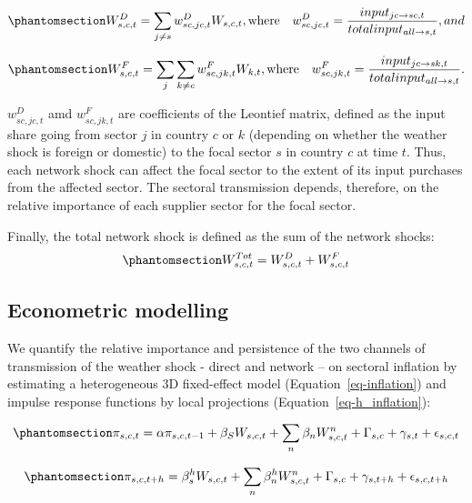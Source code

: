 \documentclass[
  letterpaper,
  DIV=11,
  numbers=noendperiod]{scrartcl}
\begin{document}
\begin{equation}\phantomsection\label{eq-dom_net_shock}{
W_{s,c,t}^D = \sum_{j \neq s} w_{sc,jc,t}^D W_{s,c,t} , \text{where} \quad w_{sc,jc,t}^D = \frac{input_{jc \rightarrow sc,t}}{total input_{all \rightarrow s,t}}, and
}\end{equation}

\begin{equation}\phantomsection\label{eq-foreign_net_shock}{
W_{s,c,t}^F = \sum_j \sum_{k \neq c} w_{sc,jk,t}^F W_{k,t} , \text{where} \quad w_{sc,jk,t}^F = \frac{input_{jc \rightarrow sk,t}}{total input_{all \rightarrow s,t}}.
}\end{equation}

\(w_{sc, jc, t}^D\) amd \(w_{sc, jk, t}^F\) are coefficients of the
Leontief matrix, defined as the input share going from sector \(j\) in
country \(c\) or \(k\) (depending on whether the weather shock is
foreign or domestic) to the focal sector \(s\) in country \(c\) at time
\(t\). Thus, each network shock can affect the focal sector to the
extent of its input purchases from the affected sector. The sectoral
transmission depends, therefore, on the relative importance of each
supplier sector for the focal sector.

Finally, the total network shock is defined as the sum of the network
shocks: \begin{equation}\phantomsection\label{eq-total_net_shock}{
W_{s,c,t}^{Tot} = W_{s,c,t}^D+ W_{s,c,t}^F
}\end{equation}

\subsection{Econometric modelling}\label{econometric-modelling}

We quantify the relative importance and persistence of the two channels
of transmission of the weather shock - direct and network -- on sectoral
inflation by estimating a heterogeneous 3D fixed-effect model
(Equation~\ref{eq-inflation}) and impulse response functions by local
projections (Equation~\ref{eq-h_inflation}):

\begin{equation}\phantomsection\label{eq-inflation}{
\pi_{s,c,t} = \alpha\pi_{s,c,t-1} + \beta_SW_{s,c,t} + \sum_n\beta_n W_{s,c,t}^n + \Gamma_{s,c}+ \gamma_{s,t}+ \epsilon_{s,c,t}     
}\end{equation}

\begin{equation}\phantomsection\label{eq-h_inflation}{
\pi_{s,c,t+h} = \beta_{s}^h W_{s,c,t} + \sum_n\beta_n^hW_{s,c,t}^n + \Gamma_{s,c} + \gamma_{s,t+h} + \epsilon_{s,c,t+h}             
}\end{equation}
\end{document}

